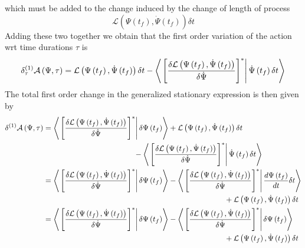 \documentclass[aps,preprint]{revtex4}
\begin{document}
which must be added to the change induced by the change of length of process 
\begin{equation}
\mathcal{L}\left( \Psi\left( t_{f}\right) ,\dot{\Psi}\left( t_{f}\right)
\right) \delta t
\end{equation}
Adding these two together we obtain that the first order variation of the
action wrt time durations $\tau$ is 
\begin{equation}
\delta_{\tau}^{\left( 1\right) }\mathcal{A}\left( \Psi,\tau\right) =\mathcal{%
L}\left( \Psi\left( t_{f}\right) ,\dot{\Psi}\left( t_{f}\right) \right)
\delta t-\left\langle \left. \left[ \frac{\delta\mathcal{L}\left( \Psi\left(
t_{f}\right) ,\dot{\Psi}\left( t_{f}\right) \right) }{\delta\dot{\Psi}}%
\right] ^{\ast}\right\vert \dot{\Psi}\left( t_{f}\right) \delta
t\right\rangle
\end{equation}
The total first order change in the generalized stationary expression is
then given by 
\begin{align}
\delta^{\left( 1\right) }\mathcal{A}\left( \Psi,\tau\right) & =\left\langle
\left. \left[ \frac{\delta\mathcal{L}\left( \Psi\left( t_{f}\right) ,\dot{%
\Psi}\left( t_{f}\right) \right) }{\delta\dot{\Psi}}\right]
^{\ast}\right\vert \delta\Psi\left( t_{f}\right) \right\rangle +\mathcal{L}%
\left( \Psi\left( t_{f}\right) ,\dot{\Psi}\left( t_{f}\right) \right) \delta
t  \notag \\
& \qquad\qquad\qquad\qquad\qquad\qquad-\left\langle \left. \left[ \frac{%
\delta\mathcal{L}\left( \Psi\left( t_{f}\right) ,\dot{\Psi}\left(
t_{f}\right) \right) }{\delta\dot{\Psi}}\right] ^{\ast}\right\vert \dot{\Psi}%
\left( t_{f}\right) \delta t\right\rangle  \notag \\
& =\left\langle \left. \left[ \frac{\delta\mathcal{L}\left( \Psi\left(
t_{f}\right) ,\dot{\Psi}\left( t_{f}\right) \right) }{\delta\dot{\Psi}}%
\right] ^{\ast}\right\vert \delta\Psi\left( t_{f}\right) \right\rangle
-\left\langle \left. \left[ \frac{\delta\mathcal{L}\left( \Psi\left(
t_{f}\right) ,\dot{\Psi}\left( t_{f}\right) \right) }{\delta\dot{\Psi}}%
\right] ^{\ast}\right\vert \frac{d\Psi\left( t_{f}\right) }{dt}\delta
t\right\rangle  \notag \\
& \qquad\qquad\qquad\qquad\qquad\qquad\qquad\qquad\qquad\qquad\qquad \qquad+%
\mathcal{L}\left( \Psi\left( t_{f}\right) ,\dot{\Psi}\left( t_{f}\right)
\right) \delta t  \notag \\
& =\left\langle \left. \left[ \frac{\delta\mathcal{L}\left( \Psi\left(
t_{f}\right) ,\dot{\Psi}\left( t_{f}\right) \right) }{\delta\dot{\Psi}}%
\right] ^{\ast}\right\vert \delta\Psi\left( t_{f}\right) \right\rangle
-\left\langle \left. \left[ \frac{\delta\mathcal{L}\left( \Psi\left(
t_{f}\right) ,\dot{\Psi}\left( t_{f}\right) \right) }{\delta\dot{\Psi}}%
\right] ^{\ast}\right\vert \delta\Psi\left( t_{f}\right) \right\rangle 
\notag \\
& \qquad\qquad\qquad\qquad\qquad\qquad\qquad\qquad\qquad\qquad\qquad \qquad+%
\mathcal{L}\left( \Psi\left( t_{f}\right) ,\dot{\Psi}\left( t_{f}\right)
\right) \delta t
\end{align}
\end{document}
